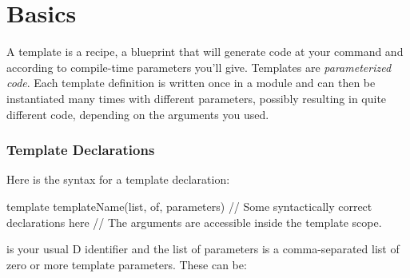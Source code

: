 \newpage
\part{Basics}\label{basics}

A template is a recipe, a blueprint that will generate code at your command and according to compile-time parameters you'll give. Templates are \emph{parameterized code}. Each template definition is written once in a module and can then be instantiated many times with different parameters, possibly resulting in quite different code, depending on the arguments you used.

\section{Template Declarations}\label{declarations}

Here is the syntax for a template declaration:

\begin{dcode}
template templateName(list, of, parameters)
{
  // Some syntactically correct declarations here
  // The arguments are accessible inside the template scope.
}
\end{dcode}


 is your usual D identifier and the list of parameters is a comma-separated list of zero or more template parameters. These can be:

